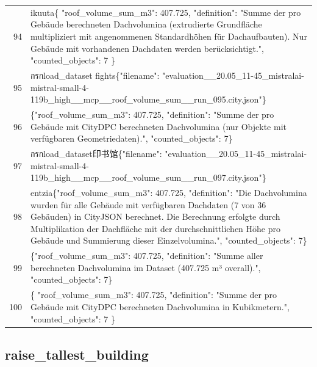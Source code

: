 \documentclass[a4paper,11pt]{article}
\begin{document}
\begin{table}[ht]
\begin{tabular}{r p{12cm}}
94 & ikuuta\{
  "roof\_volume\_sum\_m3": 407.725,
  "definition": "Summe der pro Gebäude berechneten Dachvolumina (extrudierte Grundfläche multipliziert mit angenommenen Standardhöhen für Dachaufbauten). Nur Gebäude mit vorhandenen Dachdaten werden berücksichtigt.",
  "counted\_objects": 7
\} \\
95 &  กรกload\_dataset fights\{"filename": "evaluation\_\_20.05\_11-45\_mistralai-mistral-small-4-119b\_high\_\_mcp\_\_roof\_volume\_sum\_\_run\_095.city.json"\} \\
96 & \{"roof\_volume\_sum\_m3": 407.725, "definition": "Summe der pro Gebäude mit CityDPC berechneten Dachvolumina (nur Objekte mit verfügbaren Geometriedaten).", "counted\_objects": 7\} \\
97 &  กรกload\_dataset印书馆\{"filename": "evaluation\_\_20.05\_11-45\_mistralai-mistral-small-4-119b\_high\_\_mcp\_\_roof\_volume\_sum\_\_run\_097.city.json"\} \\
98 & entzia\{"roof\_volume\_sum\_m3": 407.725, "definition": "Die Dachvolumina wurden für alle Gebäude mit verfügbaren Dachdaten (7 von 36 Gebäuden) in CityJSON berechnet. Die Berechnung erfolgte durch Multiplikation der Dachfläche mit der durchschnittlichen Höhe pro Gebäude und Summierung dieser Einzelvolumina.", "counted\_objects": 7\} \\
99 & \{"roof\_volume\_sum\_m3": 407.725, "definition": "Summe aller berechneten Dachvolumina im Dataset (407.725 m³ overall).", "counted\_objects": 7\} \\
100 & \{
  "roof\_volume\_sum\_m3": 407.725,
  "definition": "Summe der pro Gebäude mit CityDPC berechneten Dachvolumina in Kubikmetern.",
  "counted\_objects": 7
\} \\
\hline
\end{tabular}
\end{table}

\clearpage
\subsection{raise\_tallest\_building}
\end{document}
